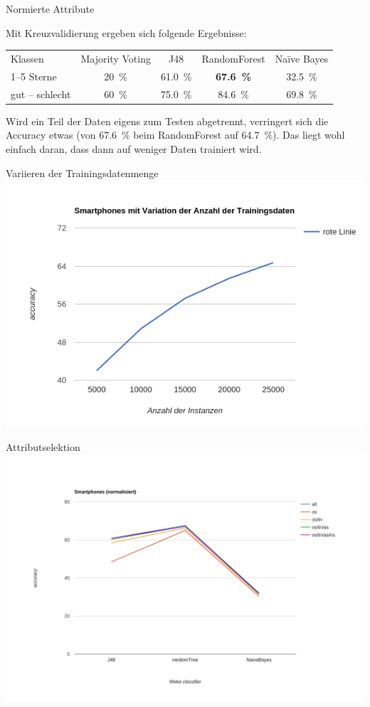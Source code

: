 \documentclass[note=hide]{beamer} %
\begin{document}
\begin{frame}{Normierte Attribute}

	Mit Kreuzvalidierung ergeben sich folgende Ergebnisse:

	\begin{tabular}{lcccc}
		\small
		Klassen & Majority Voting & J48 & RandomForest & Naïve Bayes \\
		1--5 Sterne & \SI{20}{\%} &\SI{61.0}{\%} & \textbf{\SI{67.6}{\%}} & \SI{32.5}{\%} \\
		gut -- schlecht & \SI{60}{\%} & \SI{75.0}{\%} & \SI{84.6}{\%} & \SI{69.8}{\%} \\
	\end{tabular}

	Wird ein Teil der Daten eigens zum Testen abgetrennt, verringert sich die Accuracy etwas (von \SI{67.6}{\%} beim RandomForest auf \SI{64.7}{\%}).
	Das liegt wohl einfach daran, dass dann auf weniger Daten trainiert wird.
	
\end{frame}

\begin{frame}{Variieren der Trainingsdatenmenge}
	\includegraphics[width=\framewidth]{accuracy_smartphones_normalized_trainsize.png}
\end{frame}

\begin{frame}{Attributselektion}
	\includegraphics[width=\framewidth]{accuracy_smartphones_normalized.png}
\end{frame}
\end{document}
